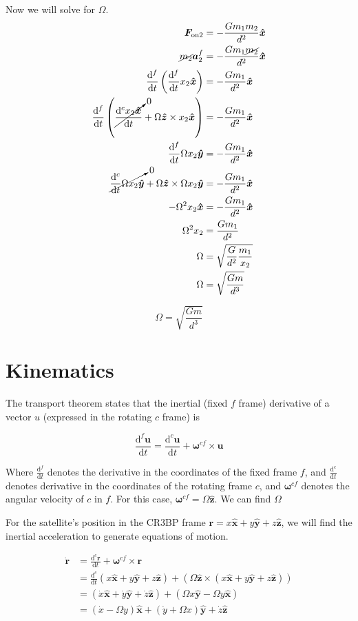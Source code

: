 \documentclass{article}
\newcommand{\dd}[2]{\frac{\mathrm{d}#1}{\mathrm{d}#2}}
\newcommand{\vv}[1]{\bm{#1}}
\newcommand{\vh}[1]{\bm{\hat{#1}}}
\begin{document}
Now we will solve for $\Omega$.
\[\begin{aligned}
    \vv{F_{\text{on2}}}&=-\frac{Gm_1m_2}{d^2}\vh{x}\\
    \cancel{m_2}\vv{a}_2^f&=-\frac{Gm_1\cancel{m_2}}{d^2}\vh{x}\\
    \dd{^f}{t}\left(\dd{^f}{t}x_2\vh{x}\right)&=-\frac{Gm_1}{d^2}\vh{x}\\
    \dd{^f}{t}\left(\cancelto{0}{\dd{^c x_2\vh{x}}{t}}+\Omega\vh{z}\times x_2\vh{x}\right)&=-\frac{Gm_1}{d^2}\vh{x}\\
    \dd{^f}{t}\Omega x_2\vh{y}&=-\frac{Gm_1}{d^2}\vh{x}\\
    \cancelto{0}{\dd{^c}{t}\Omega x_2 \vh{y}}+\Omega\vh{z}\times\Omega x_2\vh{y}&=-\frac{Gm_1}{d^2}\vh{x}\\
    -\Omega^2 x_2\vh{x}&=-\frac{Gm_1}{d^2}\vh{x}\\
    \Omega^2x_2&=\frac{Gm_1}{d^2}\\
    \Omega&=\sqrt{\frac{G}{d^2}\frac{m_1}{x_2}}\\
    \Omega&=\sqrt{\frac{Gm}{d^3}}\\
\end{aligned}\]

\[\boxed{\Omega=\sqrt{\frac{Gm}{d^3}}}\]

\section*{Kinematics}
The transport theorem states that the inertial (fixed $f$ frame) derivative of a vector $u$ (expressed in the rotating $c$ frame) is

\[\dd{^f \vv{u}}{t}=\dd{^c\vv{u}}{t}+\vv{\omega}^{cf}\times\vv{u}\]

Where $\dd{^f}{t}$ denotes the derivative in the coordinates of the fixed frame $f$, and $\dd{^c}{t}$ denotes derivative in the coordinates of the rotating frame $c$, and $\vv{\omega}^{cf}$ denotes the angular velocity of $c$ in $f$. For this case, $\vv{\omega}^{cf}=\Omega\vh{z}$. We can find $\Omega$

For the satellite's position in the CR3BP frame $\vv{r}=x\vh{x}+y\vh{y}+z\vh{z}$, we will find the inertial acceleration to generate equations of motion.

\[
\begin{aligned}
    \vv{\dot{r}}&=\dd{^c\vv{r}}{t}+\vv{\omega}^{cf}\times\vv{r}\\
    &=\dd{^c}{t}\left(x\vh{x}+y\vh{y}+z\vh{z}\right)+\left(\Omega\vh{z}\times\left(x\vh{x}+y\vh{y}+z\vh{z}\right)\right)\\
    &=\left(\dot{x}\vh{x}+\dot{y}\vh{y}+\dot{z}\vh{z}\right)+\left(\Omega x\vh{y}-\Omega y\vh{x}\right)\\
    &=\left(\dot{x}-\Omega y\right)\vh{x}+\left(\dot{y}+\Omega x\right)\vh{y}+\dot{z}\vh{z}
\end{aligned}
\]
\end{document}

